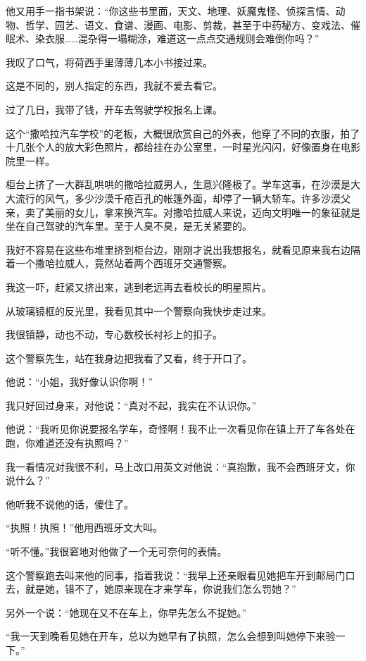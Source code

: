 \par 他又用手一指书架说：“你这些书里面，天文、地理、妖魔鬼怪、侦探言情、动物、哲学、园艺、语文、食谱、漫画、电影、剪裁，甚至于中药秘方、变戏法、催眠术、染衣服……混杂得一塌糊涂，难道这一点点交通规则会难倒你吗？”
\par 我叹了口气，将荷西手里薄薄几本小书接过来。
\par 这是不同的，别人指定的东西，我就不爱去看它。
\par 过了几日，我带了钱，开车去驾驶学校报名上课。
\par 这个“撒哈拉汽车学校”的老板，大概很欣赏自己的外表，他穿了不同的衣服，拍了十几张个人的放大彩色照片，都给挂在办公室里，一时星光闪闪，好像置身在电影院里一样。
\par 柜台上挤了一大群乱哄哄的撒哈拉威男人，生意兴隆极了。学车这事，在沙漠是大大流行的风气，多少沙漠千疮百孔的帐篷外面，却停了一辆大轿车。许多沙漠父亲，卖了美丽的女儿，拿来换汽车。对撒哈拉威人来说，迈向文明唯一的象征就是坐在自己驾驶的汽车里。至于人臭不臭，是无关紧要的。
\par 我好不容易在这些布堆里挤到柜台边，刚刚才说出我想报名，就看见原来我右边隔着一个撒哈拉威人，竟然站着两个西班牙交通警察。
\par 我这一吓，赶紧又挤出来，逃到老远再去看校长的明星照片。
\par 从玻璃镜框的反光里，我看见其中一个警察向我快步走过来。
\par 我很镇静，动也不动，专心数校长衬衫上的扣子。
\par 这个警察先生，站在我身边把我看了又看，终于开口了。
\par 他说：“小姐，我好像认识你啊！”
\par 我只好回过身来，对他说：“真对不起，我实在不认识你。”
\par 他说：“我听见你说要报名学车，奇怪啊！我不止一次看见你在镇上开了车各处在跑，你难道还没有执照吗？”
\par 我一看情况对我很不利，马上改口用英文对他说：“真抱歉，我不会西班牙文，你说什么？”
\par 他听我不说他的话，傻住了。
\par “执照！执照！”他用西班牙文大叫。
\par “听不懂。”我很窘地对他做了一个无可奈何的表情。
\par 这个警察跑去叫来他的同事，指着我说：“我早上还亲眼看见她把车开到邮局门口去，就是她，错不了，她原来现在才来学车，你说我们怎么罚她？”
\par 另外一个说：“她现在又不在车上，你早先怎么不捉她。”
\par “我一天到晚看见她在开车，总以为她早有了执照，怎么会想到叫她停下来验一下。”
